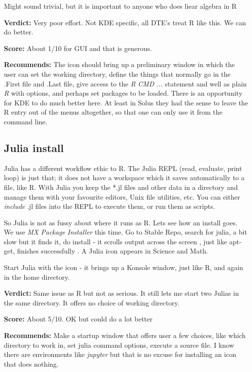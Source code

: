 \documentclass{article}  %
\begin{document}
Might sound trivial, but it is important to anyone who does liear algebra in R

 
{\bf Verdict:} Very poor effort. Not KDE specific, all DTE's treat R like this. We can do better.

{\bf Score:} About 1/10 for GUI  and that is generous.

{\bf Recommends:} The icon should bring up a preliminary window in which the user can set the working directory, define the things that normally go in the .First file and .Last file, give access to the {\em R CMD ...}  statement and well as plain {\em R} with options,  and perhaps set packages to be loaded. There is an opportunity for KDE to do much better here. At least in Solus they had the sense to leave the R entry out of the menus altogether, so that one can only use it from the command line. 


\subsection{Julia install}
Julia has a different workflow ethic to R. The Julia REPL (read, evaluate, print loop) is just that; it does not have a workspace which it saves automatically to a file, like R. With Julia you keep the *.jl files and other data in a directory and manage them with your favourite editors, Unix file utilities, etc. You can either {\em include} .jl files into the REPL to execute them, or run them as scripts. 

So Julia is not as fussy about where it runs as R. Lets see how an install goes. We use {\em MX Package Installer} this time. Go to Stable Repo, search for julia, a bit slow but it finds it, do install - it scrolls output across the screen , just like apt-get, finishes successfully .  A Julia icon appears in Science and Math. 
 
Start Julia with the icon - it brings up a Konsole window, just like R, and again in the home directory.

{\bf Verdict:} Same issue as R but not as serious.  It still lets me start two Julias in the same directory.  It offers no choice of working directory. 

{\bf Score:} About 5/10. OK but could do a lot better

{\bf Recommends:}  Make a startup window that offers user a few choices, like which directory to work in, set julia command options,  execute a source file. I know there are environments like {\em jupyter} but that is no excuse for installing an icon that does nothing.
\end{document}
